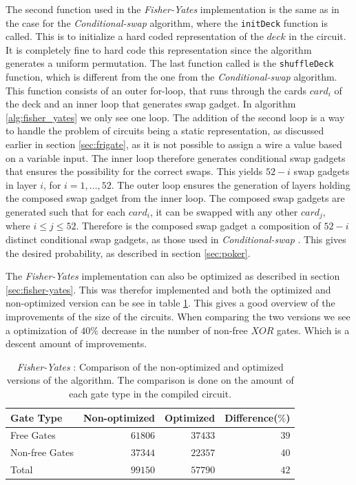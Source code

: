 \documentclass[twoside,11pt,openright]{report}
\newcommand{\FY}{\textit{Fisher-Yates} }
\newcommand{\CS}{\textit{Conditional-swap} }
\begin{document}
The second function used in the \FY implementation is the same as in the case for the \CS algorithm, where the \verb|initDeck| function is called. This is to initialize a hard coded representation of the $deck$ in the circuit. It is completely fine to hard code this representation since the algorithm generates a uniform permutation. The last function called is the \verb|shuffleDeck| function, which is different from the one from the \CS algorithm. This function consists of an outer for-loop, that runs through the cards $card_i$ of the deck and an inner loop that generates swap gadget. In algorithm \ref{alg:fisher_yates} we only see one loop. The addition of the second loop is a way to handle the problem of circuits being a static representation, as discussed earlier in section \ref{sec:frigate}, as it is not possible to assign a wire a value based on a variable input.  The inner loop therefore generates conditional swap gadgets that ensures the possibility for the correct swaps. This yields $52-i$ swap gadgets in layer $i$, for $i=1,\dots, 52$. The outer loop ensures the generation of layers holding the composed swap gadget from the inner loop. The composed swap gadgets are generated such that for each $card_i$, it can be swapped with any other $card_j$, where $i\leq j\leq 52$. Therefore is the composed swap gadget a composition of $52-i$ distinct conditional swap gadgets, as those used in \CS. This gives the desired probability, as described in section \ref{sec:poker}.

The \FY implementation can also be optimized as described in section \ref{sec:fisher-yates}. This was therefor implemented and both the optimized and non-optimized version can be see in table \ref{table:fy_swap_comp}. This gives a good overview of the improvements of the size of the circuits. When comparing the two versions we see a optimization of $40\%$ decrease in the number of non-free $XOR$ gates. Which is a descent amount of improvements.

\begin{table}[t]
\centering
\begin{tabular}{l || r r r}
Gate Type      & Non-optimized  & Optimized & Difference($\%$)    \\
\hline
Free Gates     & $61806$        & $37433$   & $39$ \\
Non-free Gates & $37344$        & $22357$   & $40$ \\
\hline
Total          & $99150$        & $57790$   & $42$
\end{tabular}
\caption{\FY: Comparison of the non-optimized and optimized versions of the algorithm. The comparison is done on the amount of each gate type in the compiled circuit.}
\label{table:fy_swap_comp}
\end{table}
\end{document}
